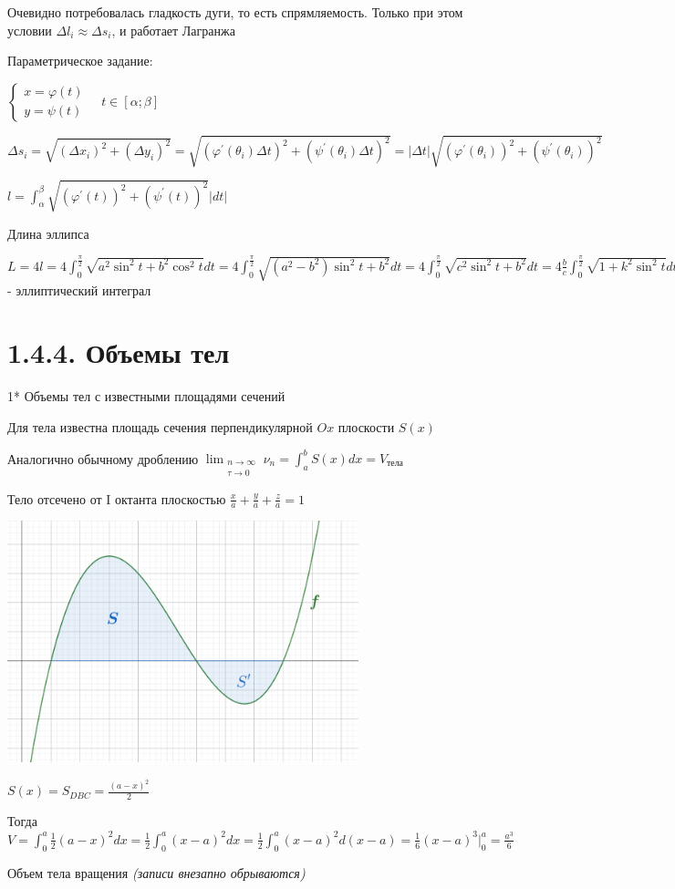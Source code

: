 \documentclass[12pt]{article}
\begin{document}
    \Nota Очевидно потребовалась гладкость дуги, то есть спрямляемость. Только при этом условии $\Delta l_i \approx \Delta s_i$, и работает \Ths Лагранжа

    Параметрическое задание:

    $\begin{cases}x = \varphi(t) \\ y = \psi(t)\end{cases} \quad t \in [\alpha;\beta]$

    $\Delta s_i = \sqrt{(\Delta x_i)^2 + (\Delta y_i)^2} = \sqrt{(\varphi^\prime(\theta_i) \Delta t)^2 + (\psi^\prime(\theta_i) \Delta t)^2} =
    |\Delta t|\sqrt{(\varphi^\prime(\theta_i))^2 + (\psi^\prime(\theta_i))^2}$

    $l = \int^\beta_\alpha \sqrt{(\varphi^\prime(t))^2 + (\psi^\prime(t))^2} |dt|$

    \Ex Длина эллипса

    $L = 4l = 4 \int^\frac{\pi}{2}_0 \sqrt{a^2 \sin^2 t + b^2 \cos^2 t} dt =
    4 \int^\frac{\pi}{2}_0 \sqrt{(a^2 - b^2) \sin^2 t + b^2} dt =
    4 \int^\frac{\pi}{2}_0 \sqrt{c^2 \sin^2 t + b^2} dt = 4 \frac{b}{c} \int^\frac{\pi}{2}_0 \sqrt{1 + k^2 \sin^2 t} dt$ - эллиптический интеграл

    \section{1.4.4. Объемы тел}

    1* Объемы тел с известными площадями сечений

    Для тела известна площадь сечения перпендикулярной $Ox$ плоскости $S(x)$

    Аналогично обычному дроблению $\lim_{\substack{n \to \infty \\ \tau \to 0}} \nu_n = \int^b_a S(x)dx = V_\text{тела}$

    \Ex Тело отсечено от I октанта плоскостью $\frac{x}{a} + \frac{y}{a} + \frac{z}{a} = 1$

    \includegraphics[height=7cm]{images/calculus_2024_02_14_1}

    $S(x) = S_{DBC} = \frac{(a - x)^2}{2}$

    Тогда $V = \int_0^a \frac{1}{2} (a - x)^2 dx = \frac{1}{2} \int_0^a (x - a)^2 dx =
    \frac{1}{2} \int^a_0 (x - a)^2 d(x - a) = \frac{1}{6} (x - a)^3 \Big|^a_0 = \frac{a^3}{6}$

    \Nota Объем тела вращения \textit{(записи внезапно обрываются)}
\end{document}
